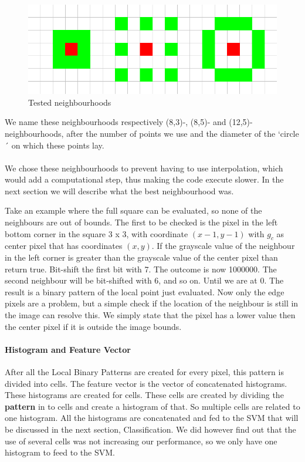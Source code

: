\documentclass[a4paper]{article}
\begin{document}
\begin{figure}[H]
\center
\includegraphics[scale=0.5]{neighbourhoods.png}
\caption{Tested neighbourhoods}
\end{figure}

We name these neighbourhoods respectively (8,3)-, (8,5)- and
(12,5)-neighbourhoods, after the number of points we use and the diameter
of the `circle´ on which these points lay.\\
\\
We chose these neighbourhoods to prevent having to use interpolation, which
would add a computational step, thus making the code execute slower. In the
next section we will describe what the best neighbourhood was.

Take an example where the full square can be evaluated, so none of the
neighbours are out of bounds. The first to be checked is the pixel in the left 
bottom corner in the square 3 x 3, with coordinate $(x - 1, y - 1)$ with $g_c$ 
as center pixel that has coordinates $(x, y)$. If the grayscale value of the
neighbour in the left corner is greater than the grayscale
value of the center pixel than return true. Bit-shift the first bit with 7. The
outcome is now 1000000. The second neighbour will be bit-shifted with 6, and so 
on. Until we are at 0. The result is a binary pattern of the local point just
evaluated.
Now only the edge pixels are a problem, but a simple check if the location of
the neighbour is still in the image can resolve this. We simply state that the
pixel has a lower value then the center pixel if it is outside the image
bounds.

\paragraph*{Histogram and Feature Vector}
After all the Local Binary Patterns are created for every pixel, this pattern
is divided into cells. The feature vector is the vector of concatenated
histograms. These histograms are created for cells. These cells are created by
dividing the \textbf{pattern} in to cells and create a histogram of that. So
multiple cells are related to one histogram. All the histograms are
concatenated and fed to the SVM that will be discussed in the next section,
Classification. We did however find out that the use of several cells was not
increasing our performance, so we only have one histogram to feed to the SVM.
\end{document}
